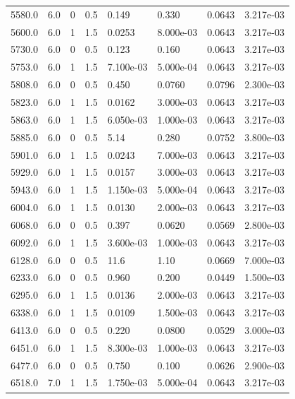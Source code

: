 \documentclass[preview]{standalone}
\begin{document}
{{{{\begin{tabular}{L{1.2cm}C{1.2cm} C{0.3cm}C{0.5cm} C{1.4cm}C{1.4cm} C{1.4cm}C{1.4cm}}
  5580.0  &   6.0  & 0     & 0.5 &  0.149  & 0.330  & 0.0643 &  3.217e-03   \\ 
  5600.0  &   6.0  & 1     & 1.5 &  0.0253  & 8.000e-03  & 0.0643 &  3.217e-03   \\ 
  5730.0  &   6.0  & 0     & 0.5 &  0.123  & 0.160  & 0.0643 &  3.217e-03   \\ 
  5753.0  &   6.0  & 1     & 1.5 &  7.100e-03  & 5.000e-04  & 0.0643 &  3.217e-03   \\ 
  5808.0  &   6.0  & 0     & 0.5 &  0.450  & 0.0760  & 0.0796 &  2.300e-03   \\ 
  5823.0  &   6.0  & 1     & 1.5 &  0.0162  & 3.000e-03  & 0.0643 &  3.217e-03   \\ 
  5863.0  &   6.0  & 1     & 1.5 &  6.050e-03  & 1.000e-03  & 0.0643 &  3.217e-03   \\ 
  5885.0  &   6.0  & 0     & 0.5 &  5.14  & 0.280  & 0.0752 &  3.800e-03   \\ 
  5901.0  &   6.0  & 1     & 1.5 &  0.0243  & 7.000e-03  & 0.0643 &  3.217e-03   \\ 
  5929.0  &   6.0  & 1     & 1.5 &  0.0157  & 3.000e-03  & 0.0643 &  3.217e-03   \\ 
  5943.0  &   6.0  & 1     & 1.5 &  1.150e-03  & 5.000e-04  & 0.0643 &  3.217e-03   \\ 
  6004.0  &   6.0  & 1     & 1.5 &  0.0130  & 2.000e-03  & 0.0643 &  3.217e-03   \\ 
  6068.0  &   6.0  & 0     & 0.5 &  0.397  & 0.0620  & 0.0569 &  2.800e-03   \\ 
  6092.0  &   6.0  & 1     & 1.5 &  3.600e-03  & 1.000e-03  & 0.0643 &  3.217e-03   \\ 
  6128.0  &   6.0  & 0     & 0.5 &  11.6  & 1.10  & 0.0669 &  7.000e-03   \\ 
  6233.0  &   6.0  & 0     & 0.5 &  0.960  & 0.200  & 0.0449 &  1.500e-03   \\ 
  6295.0  &   6.0  & 1     & 1.5 &  0.0136  & 2.000e-03  & 0.0643 &  3.217e-03   \\ 
  6338.0  &   6.0  & 1     & 1.5 &  0.0109  & 1.500e-03  & 0.0643 &  3.217e-03   \\ 
  6413.0  &   6.0  & 0     & 0.5 &  0.220  & 0.0800  & 0.0529 &  3.000e-03   \\ 
  6451.0  &   6.0  & 1     & 1.5 &  8.300e-03  & 1.000e-03  & 0.0643 &  3.217e-03   \\ 
  6477.0  &   6.0  & 0     & 0.5 &  0.750  & 0.100  & 0.0626 &  2.900e-03   \\ 
  6518.0  &   7.0  & 1     & 1.5 &  1.750e-03  & 5.000e-04  & 0.0643 &  3.217e-03   \\ 

\end{tabular}}}}}
\end{document}
